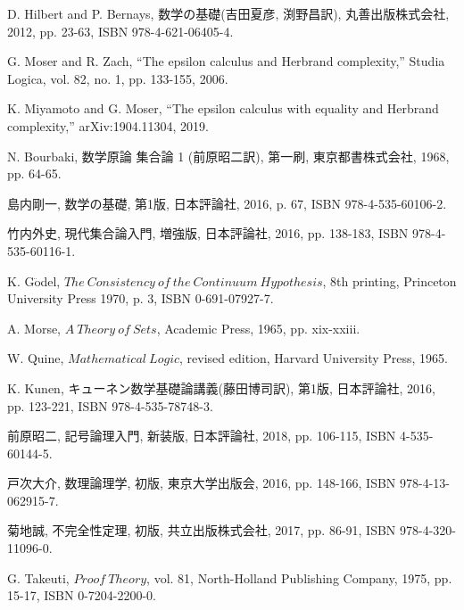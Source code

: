 \begin{thebibliography}{数字}
	 D. Hilbert and P. Bernays, 数学の基礎(吉田夏彦, 渕野昌訳), 丸善出版株式会社, 2012, pp. 23-63, ISBN 978-4-621-06405-4.
	
	 G. Moser and R. Zach, ``The epsilon calculus and Herbrand complexity,''
		Studia Logica, vol. 82, no. 1, pp. 133-155, 2006.
	
	 K. Miyamoto and G. Moser, ``The epsilon calculus with equality and Herbrand complexity,'' arXiv:1904.11304, 2019.
	
	 N. Bourbaki, 数学原論 集合論 1 (前原昭二訳), 第一刷, 東京都書株式会社, 1968, pp. 64-65.
	
	 島内剛一, 数学の基礎, 第1版, 日本評論社, 2016, p. 67, ISBN 978-4-535-60106-2.
	
	 竹内外史, 現代集合論入門, 増強版, 日本評論社, 2016, pp. 138-183, ISBN 978-4-535-60116-1.
	
	 K. G$\ddot{\mbox{o}}$del, $The\ Consistency\ of\ the\ Continuum\ Hypothesis$, 8th printing, Princeton University Press 1970, p. 3, ISBN 0-691-07927-7.
	
	 A. Morse, $A\ Theory\ of\ Sets$, Academic Press, 1965, pp. xix-xxiii.
	
	 W. Quine, $Mathematical\ Logic$, revised edition, Harvard University Press, 1965.
	
	 K. Kunen, キューネン数学基礎論講義(藤田博司訳), 第1版, 日本評論社, 2016, pp. 123-221, ISBN 978-4-535-78748-3. 
	
	 前原昭二, 記号論理入門, 新装版, 日本評論社, 2018, pp. 106-115, ISBN 4-535-60144-5.
	
	 戸次大介, 数理論理学, 初版, 東京大学出版会, 2016, pp. 148-166, ISBN 978-4-13-062915-7.
	
	 菊地誠, 不完全性定理, 初版, 共立出版株式会社, 2017, pp. 86-91, ISBN 978-4-320-11096-0.
	
	 G. Takeuti, $Proof\ Theory$, vol. 81, North-Holland Publishing Company, 1975, pp. 15-17, ISBN 0-7204-2200-0. 
\end{thebibliography}